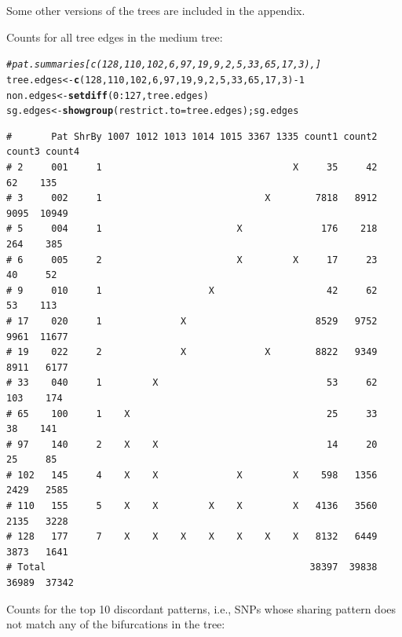 \documentclass{article}\usepackage[]{graphicx}\usepackage[]{color}
\makeatletter
\newcommand{\hlnum}[1]{\textcolor[rgb]{0.686,0.059,0.569}{#1}}%
\newcommand{\hlcom}[1]{\textcolor[rgb]{0.678,0.584,0.686}{\textit{#1}}}%
\newcommand{\hlopt}[1]{\textcolor[rgb]{0,0,0}{#1}}%
\newcommand{\hlstd}[1]{\textcolor[rgb]{0.345,0.345,0.345}{#1}}%
\newcommand{\hlkwb}[1]{\textcolor[rgb]{0.69,0.353,0.396}{#1}}%
\newcommand{\hlkwc}[1]{\textcolor[rgb]{0.333,0.667,0.333}{#1}}%
\newcommand{\hlkwd}[1]{\textcolor[rgb]{0.737,0.353,0.396}{\textbf{#1}}}%
\newenvironment{kframe}{%
 \def\at@end@of@kframe{}%
 \ifinner\ifhmode%
  \def\at@end@of@kframe{\end{minipage}}%
  \begin{minipage}{\columnwidth}%
 \fi\fi%
 \def\FrameCommand##1{\hskip\@totalleftmargin \hskip-\fboxsep
 \colorbox{shadecolor}{##1}\hskip-\fboxsep
     \hskip-\linewidth \hskip-\@totalleftmargin \hskip\columnwidth}%
 \MakeFramed {\advance\hsize-\width
   \@totalleftmargin\z@ \linewidth\hsize
   \@setminipage}}%
 {\par\unskip\endMakeFramed%
 \at@end@of@kframe}
\newenvironment{knitrout}{}{} %
\makeatother
\begin{document}
Some other versions of the trees are included in the appendix.

Counts for all tree edges in the medium tree: 

\begin{knitrout}\scriptsize
{}\color{fgcolor}\begin{kframe}
\begin{alltt}
\hlcom{#pat.summaries[c(128,110,102,6,97,19,9,2,5,33,65,17,3),]}
\hlstd{tree.edges} \hlkwb{<-} \hlkwd{c}\hlstd{(}\hlnum{128}\hlstd{,}\hlnum{110}\hlstd{,}\hlnum{102}\hlstd{,}\hlnum{6}\hlstd{,}\hlnum{97}\hlstd{,}\hlnum{19}\hlstd{,}\hlnum{9}\hlstd{,}\hlnum{2}\hlstd{,}\hlnum{5}\hlstd{,}\hlnum{33}\hlstd{,}\hlnum{65}\hlstd{,}\hlnum{17}\hlstd{,}\hlnum{3}\hlstd{)}\hlopt{-}\hlnum{1}
\hlstd{non.edges} \hlkwb{<-} \hlkwd{setdiff}\hlstd{(}\hlnum{0}\hlopt{:}\hlnum{127}\hlstd{, tree.edges)}
\hlstd{sg.edges} \hlkwb{<-} \hlkwd{showgroup}\hlstd{(}\hlkwc{restrict.to}\hlstd{=tree.edges) ; sg.edges}
\end{alltt}
\begin{verbatim}
#       Pat ShrBy 1007 1012 1013 1014 1015 3367 1335 count1 count2 count3 count4
# 2     001     1                                  X     35     42     62    135
# 3     002     1                             X        7818   8912   9095  10949
# 5     004     1                        X              176    218    264    385
# 6     005     2                        X         X     17     23     40     52
# 9     010     1                   X                    42     62     53    113
# 17    020     1              X                       8529   9752   9961  11677
# 19    022     2              X              X        8822   9349   8911   6177
# 33    040     1         X                              53     62    103    174
# 65    100     1    X                                   25     33     38    141
# 97    140     2    X    X                              14     20     25     85
# 102   145     4    X    X              X         X    598   1356   2429   2585
# 110   155     5    X    X         X    X         X   4136   3560   2135   3228
# 128   177     7    X    X    X    X    X    X    X   8132   6449   3873   1641
# Total                                               38397  39838  36989  37342
\end{verbatim}
\end{kframe}
\end{knitrout}

Counts for the top 10 discordant patterns, i.e., SNPs whose sharing pattern does not match any of the bifurcations in the tree:
\end{document}
